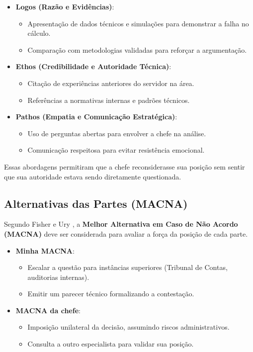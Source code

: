 \documentclass[article,12pt,oneside,a4paper]{article}
\begin{document}
\begin{itemize}
\item \textbf{Logos (Razão e Evidências)}:  
\begin{itemize}
\item Apresentação de dados técnicos e simulações para demonstrar a falha no cálculo.
\item Comparação com metodologias validadas para reforçar a argumentação.
\end{itemize}

\item \textbf{Ethos (Credibilidade e Autoridade Técnica)}:  
\begin{itemize}
\item Citação de experiências anteriores do servidor na área.
\item Referências a normativas internas e padrões técnicos.
\end{itemize}

\item \textbf{Pathos (Empatia e Comunicação Estratégica)}:  
\begin{itemize}
\item Uso de perguntas abertas para envolver a chefe na análise.
\item Comunicação respeitosa para evitar resistência emocional.
\end{itemize}
\end{itemize}

Essas abordagens permitiram que a chefe reconsiderasse sua posição sem sentir que sua autoridade estava sendo diretamente questionada.
\subsection{Alternativas das Partes (MACNA)}
\label{sec:orga0b1bb3}
Segundo Fisher e Ury \cite{fisher1991getting}, a \textbf{Melhor Alternativa em Caso de Não Acordo (MACNA)} deve ser considerada para avaliar a força da posição de cada parte.

\begin{itemize}
\item \textbf{Minha MACNA}:  
\begin{itemize}
\item Escalar a questão para instâncias superiores (Tribunal de Contas, auditorias internas).
\item Emitir um parecer técnico formalizando a contestação.
\end{itemize}

\item \textbf{MACNA da chefe}:  
\begin{itemize}
\item Imposição unilateral da decisão, assumindo riscos administrativos.
\item Consulta a outro especialista para validar sua posição.
\end{itemize}
\end{itemize}
\end{document}
